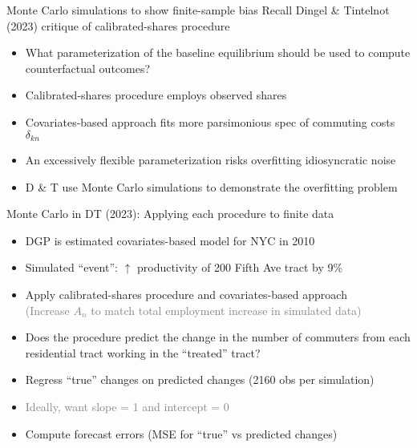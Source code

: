 \documentclass[11pt,notes=hide,aspectratio=169]{beamer}
\begin{document}
\begin{frame}{Monte Carlo simulations to show finite-sample bias}
Recall Dingel \& Tintelnot (2023) critique of calibrated-shares procedure
\begin{itemize}
\item What parameterization of the baseline equilibrium should be used to compute counterfactual outcomes?
\item Calibrated-shares procedure employs observed shares
\item Covariates-based approach fits more parsimonious spec of commuting costs $\delta_{kn}$
\item An excessively flexible parameterization risks overfitting idiosyncratic noise
\item D \& T use Monte Carlo simulations to demonstrate the overfitting problem
\end{itemize}
\end{frame}
\begin{frame}{Monte Carlo in DT (2023): Applying each procedure to finite data}
\begin{itemize}
\item DGP is estimated covariates-based model for NYC in 2010
\item Simulated ``event'': $\uparrow$ productivity of 200 Fifth Ave tract by 9\%
\item Apply calibrated-shares procedure and covariates-based approach \\
\textcolor{gray}{\small (Increase ${A_n}$ to match total employment increase in simulated data)}
\item Does the procedure predict the change in the number of commuters from each residential tract working in the ``treated'' tract?
\item Regress ``true'' changes on predicted changes (2160 obs per simulation)
\item[] \textcolor{gray}{Ideally, want slope = 1 and intercept = 0}
\item Compute forecast errors (MSE for ``true'' vs predicted changes)
\end{itemize}
\end{frame}
\end{document}

